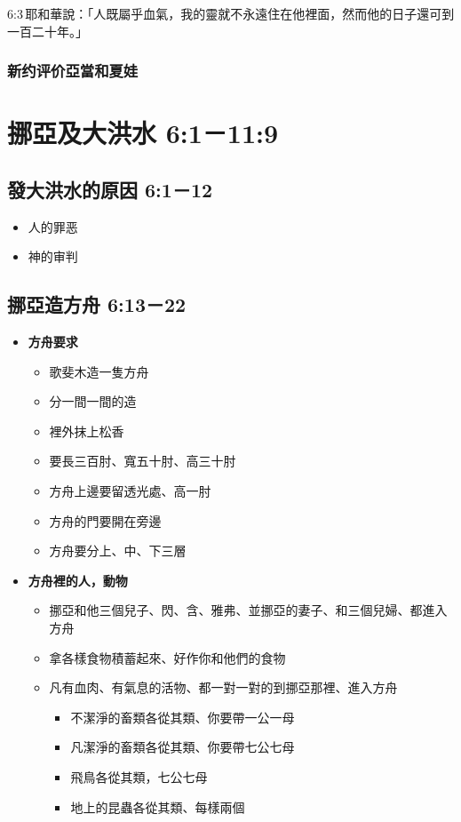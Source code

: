 6:3 耶和華說：「人既屬乎血氣，我的靈就不永遠住在他裡面，然而他的日子還可到一百二十年。」

\subsubsection{新约评价亞當和夏娃}


\section{挪亞及大洪水 6:1－11:9}
\subsection{發大洪水的原因 6:1－12}
\noindent
\begin{itemize} 
\itemsep-.35em 
\item 人的罪恶

\item 神的审判

\end{itemize}

\subsection{挪亞造方舟 6:13－22}%
\noindent
\begin{itemize} 
\itemsep-.35em 
\item \textbf{方舟要求} 
\begin{itemize} 
\itemsep-.35em 
\item 歌斐木造一隻方舟 
\item 分一間一間的造 
\item 裡外抹上松香 
\item 要長三百肘、寬五十肘、高三十肘 
\item 方舟上邊要留透光處、高一肘 
\item 方舟的門要開在旁邊 
\item 方舟要分上、中、下三層
\end{itemize}
\item \textbf{方舟裡的人，動物}
\begin{itemize} 
\itemsep-.35em 
\item 挪亞和他三個兒子、閃、含、雅弗、並挪亞的妻子、和三個兒婦、都進入方舟
\item 拿各樣食物積蓄起來、好作你和他們的食物
\item 凡有血肉、有氣息的活物、都一對一對的到挪亞那裡、進入方舟
\begin{itemize} 
\itemsep-.35em 
\item 不潔淨的畜類各從其類、你要帶一公一母 
\item 凡潔淨的畜類各從其類、你要帶七公七母 
\item 飛鳥各從其類，七公七母 
\item 地上的昆蟲各從其類、每樣兩個 
\end{itemize}
\end{itemize}
\end{itemize}

